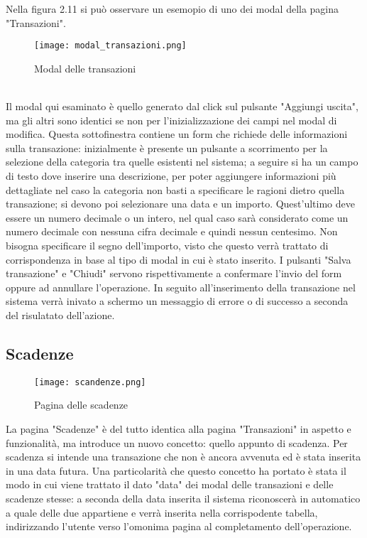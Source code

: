 \documentclass[binding=0.6cm, oneside, noexaminfo, italian]{sapthesis}
\begin{document}
Nella figura 2.11 si può osservare un esemopio di uno dei modal della pagina "Transazioni". \\
\begin{figure}[h]
    \centering
    \texttt{[image: modal\_transazioni.png]}
    \caption{Modal delle transazioni}
    \label{fig:modal_transazioni}
\end{figure} \\
Il modal qui esaminato è quello generato dal click sul pulsante "Aggiungi uscita", ma gli altri sono identici se non per l'inizializzazione dei campi nel modal di modifica. Questa sottofinestra contiene un form che richiede delle informazioni sulla transazione: inizialmente è presente un pulsante a scorrimento per la selezione della categoria tra quelle esistenti nel sistema; a seguire si ha un campo di testo dove inserire una descrizione, per poter aggiungere informazioni più dettagliate nel caso la categoria non basti a specificare le ragioni dietro quella transazione; si devono poi selezionare una data e un importo. Quest'ultimo deve essere un numero decimale o un intero, nel qual caso sarà considerato come un numero decimale con nessuna cifra decimale e quindi nessun centesimo. Non bisogna specificare il segno dell'importo, visto che questo verrà trattato di corrispondenza in base al tipo di modal in cui è stato inserito. I pulsanti "Salva transazione" e "Chiudi" servono rispettivamente a confermare l'invio del form oppure ad annullare l'operazione. In seguito all'inserimento della transazione nel sistema verrà inivato a schermo un messaggio di errore o di successo a seconda del risulatato dell'azione.
\subsection{Scadenze}
\begin{figure}[h]
    \centering
    \texttt{[image: scandenze.png]}
    \caption{Pagina delle scadenze}
    \label{fig:scadenze}
\end{figure}
La pagina "Scadenze" è del tutto identica alla pagina "Transazioni" in aspetto e funzionalità, ma introduce un nuovo concetto: quello appunto di scadenza. Per scadenza si intende una transazione che non è ancora avvenuta ed è stata inserita in una data futura. Una particolarità che questo concetto ha portato è stata il modo in cui viene trattato il dato "data" dei modal delle transazioni e delle scadenze stesse: a seconda della data inserita il sistema riconoscerà in automatico a quale delle due appartiene e verrà inserita nella corrispodente tabella, indirizzando l'utente verso l'omonima pagina al completamento dell'operazione.
\newpage
\end{document}
